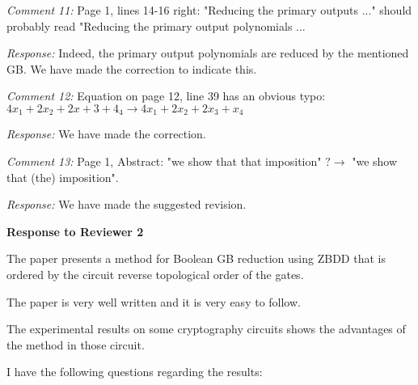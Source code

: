 \documentclass[conference, onecolumn]{IEEEtran}
\begin{document}
\par{\it Comment 11:} Page 1, lines 14-16 right: "Reducing the primary
outputs ..." should probably read "Reducing the primary output
polynomials ... 
\par{\it Response:} Indeed, the primary output polynomials 
are reduced by the mentioned GB. We have made the correction to indicate this.

\par{\it Comment 12:} Equation on page 12, line 39 has an obvious typo:
$4x_1 + 2x_2 + 2x + 3+ 4_4  \rightarrow  4x_1 + 2x_2 + 2x_3 + x_4$
\par{\it Response:} We have made the correction.

\par{\it Comment 13:} Page 1, Abstract: "we show that that imposition" $?\rightarrow$ "we show that (the) imposition".
\par{\it Response:} We have made the suggested revision.


\begin{center}
{\bf \large Response to Reviewer 2}
\end{center}  
\vspace{0.1in}
\par The paper presents a method for Boolean GB reduction using ZBDD that is ordered by the circuit reverse topological order of the gates.
\par The paper is very well written and it is very easy to follow.
\par The experimental results on some cryptography circuits shows the advantages of the method in those circuit.
\par I have the following questions regarding the results:

\end{document}
